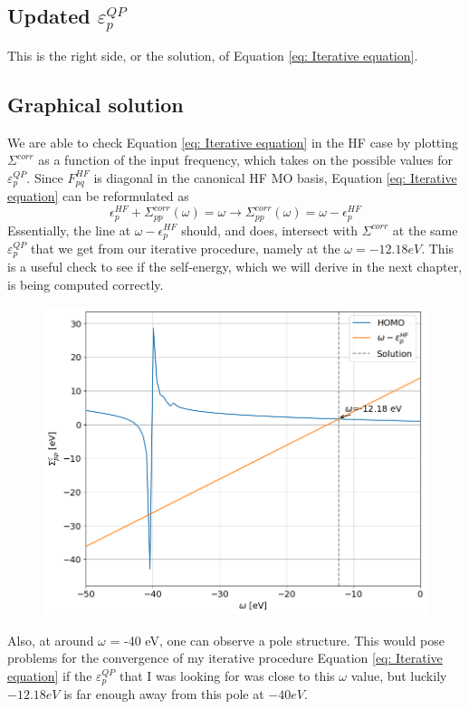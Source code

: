 \documentclass[12pt]{caltech_thesis}
\begin{document}
\subsection{Updated $\varepsilon_{p}^{QP}$}
This is the right side, or the solution, of Equation \ref{eq: Iterative equation}.
\newpage
\subsection{Graphical solution}
We are able to check Equation \ref{eq: Iterative equation} in the HF case by plotting $\Sigma^{corr}$ as a function of the input frequency, which takes on  the possible values for $\varepsilon_{p}^{QP}$. Since $F_{pq}^{HF}$ is diagonal in the canonical HF MO basis, Equation \ref{eq: Iterative equation} can be reformulated as
\begin{equation}
    \epsilon _{p}^{HF} + \Sigma_{pp}^{corr}(\omega) = \omega  \rightarrow \Sigma_{pp}^{corr}(\omega) = \omega  - \epsilon _{p}^{HF}
\end{equation}
Essentially, the line at $\omega - \epsilon_{p}^{HF}$ should, and does, intersect with $\Sigma^{corr}$ at the same $\varepsilon_{p}^{QP}$ that we get from our iterative procedure, namely at the $\omega = -12.18 eV$.
 This is a useful check to see if the self-energy, which we will derive in the next chapter, is being computed correctly.

\begin{figure}[h]
    \centering
    \includegraphics[width=\textwidth]{correlation_energies.png}
\end{figure}
Also, at around $\omega$ = -40 eV, one can observe a pole structure. This would pose problems for the convergence of my iterative procedure Equation \ref{eq: Iterative equation} if the $\varepsilon_{p}^{QP}$ that I was looking for was close to this $\omega $ value, but luckily $-12.18 eV$ is far enough away from this pole at $-40 eV$.
\end{document}
